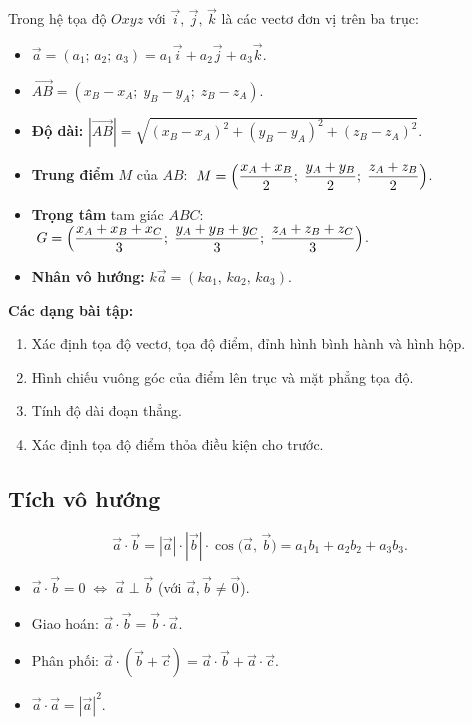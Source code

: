 \documentclass[12pt,a4paper]{article}
\begin{document}
\begin{congthuc}
  Trong hệ tọa độ $Oxyz$ với $\vec{i},\, \vec{j},\, \vec{k}$ là các vectơ đơn vị trên ba trục:
  \begin{itemize}
    \item $\vec{a} = (a_1;\, a_2;\, a_3) = a_1\vec{i} + a_2\vec{j} + a_3\vec{k}$.
    \item $\overrightarrow{AB} = (x_B - x_A;\; y_B - y_A;\; z_B - z_A)$.
    \item \textbf{Độ dài:} $|\overrightarrow{AB}| = \sqrt{(x_B - x_A)^2 + (y_B - y_A)^2 + (z_B - z_A)^2}$.
    \item \textbf{Trung điểm} $M$ của $AB$:
      $\;M = \Bigl(\dfrac{x_A + x_B}{2};\; \dfrac{y_A + y_B}{2};\; \dfrac{z_A + z_B}{2}\Bigr)$.
    \item \textbf{Trọng tâm} tam giác $ABC$:
      $\;G = \Bigl(\dfrac{x_A + x_B + x_C}{3};\; \dfrac{y_A + y_B + y_C}{3};\; \dfrac{z_A + z_B + z_C}{3}\Bigr)$.
    \item \textbf{Nhân vô hướng:} $k\vec{a} = (ka_1,\, ka_2,\, ka_3)$.
  \end{itemize}
\end{congthuc}

\medskip\noindent\textbf{Các dạng bài tập:}
\begin{enumerate}[label=\textbf{Dạng \arabic*:}, leftmargin=*, align=left]
  \item Xác định tọa độ vectơ, tọa độ điểm, đỉnh hình bình hành và hình hộp.
  \item Hình chiếu vuông góc của điểm lên trục và mặt phẳng tọa độ.
  \item Tính độ dài đoạn thẳng.
  \item Xác định tọa độ điểm thỏa điều kiện cho trước.
\end{enumerate}

\subsection{Tích vô hướng}

\begin{congthuc}
  \[
    \vec{a} \cdot \vec{b}
    = |\vec{a}| \cdot |\vec{b}| \cdot \cos\bigl(\vec{a},\, \vec{b}\bigr)
    = a_1 b_1 + a_2 b_2 + a_3 b_3.
  \]
\end{congthuc}

\begin{tinhchat}
  \begin{itemize}
    \item $\vec{a} \cdot \vec{b} = 0 \;\Leftrightarrow\; \vec{a} \perp \vec{b}$ \;(với $\vec{a}, \vec{b} \ne \vec{0}$).
    \item Giao hoán: $\vec{a} \cdot \vec{b} = \vec{b} \cdot \vec{a}$.
    \item Phân phối: $\vec{a} \cdot (\vec{b} + \vec{c}) = \vec{a} \cdot \vec{b} + \vec{a} \cdot \vec{c}$.
    \item $\vec{a} \cdot \vec{a} = |\vec{a}|^2$.
  \end{itemize}
\end{tinhchat}
\end{document}
